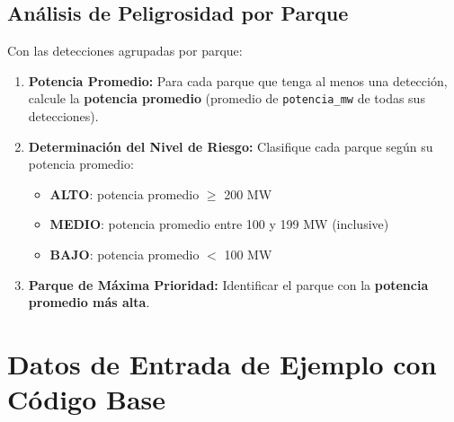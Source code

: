 \documentclass[11pt,a4paper]{article}
\begin{document}
\subsection{Análisis de Peligrosidad por Parque}

Con las detecciones agrupadas por parque:

\begin{enumerate}[leftmargin=*]
    \item \textbf{Potencia Promedio:} Para cada parque que tenga al menos una detección, calcule la \textbf{potencia promedio} (promedio de \texttt{potencia\_mw} de todas sus detecciones).
    
    \item \textbf{Determinación del Nivel de Riesgo:} Clasifique cada parque según su potencia promedio:
    \begin{itemize}
        \item \textbf{ALTO}: potencia promedio $\geq$ 200 MW
        \item \textbf{MEDIO}: potencia promedio entre 100 y 199 MW (inclusive)
        \item \textbf{BAJO}: potencia promedio $<$ 100 MW
    \end{itemize}
    
    \item \textbf{Parque de Máxima Prioridad:} Identificar el parque con la \textbf{potencia promedio más alta}. 
\end{enumerate}

\newpage

\section{Datos de Entrada de Ejemplo con Código Base}
\end{document}

